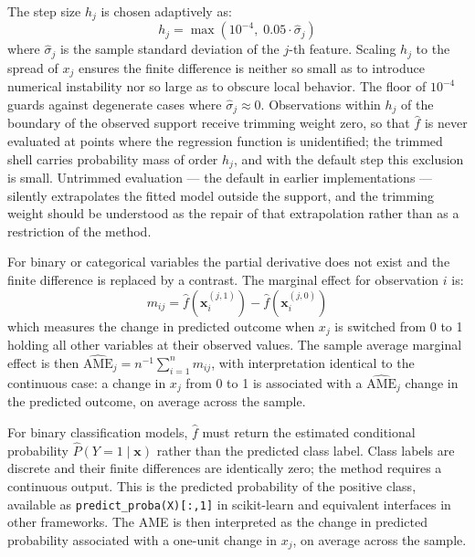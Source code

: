 \documentclass[12pt]{article}
\begin{document}
	The step size $h_j$ is chosen adaptively as:
	\begin{equation}
		h_j = \max\!\left(10^{-4},\; 0.05 \cdot \hat{\sigma}_j\right)
	\end{equation}
	where $\hat{\sigma}_j$ is the sample standard deviation of the $j$-th feature. Scaling $h_j$ to the spread of $x_j$ ensures the finite difference is neither so small as to introduce numerical instability nor so large as to obscure local behavior. The floor of $10^{-4}$ guards against degenerate cases where $\hat{\sigma}_j \approx 0$. Observations within $h_j$ of the boundary of the observed support receive trimming weight zero, so that $\hat{f}$ is never evaluated at points where the regression function is unidentified; the trimmed shell carries probability mass of order $h_j$, and with the default step this exclusion is small. Untrimmed evaluation --- the default in earlier implementations --- silently extrapolates the fitted model outside the support, and the trimming weight should be understood as the repair of that extrapolation rather than as a restriction of the method.
	
	For binary or categorical variables the partial derivative does not exist and the finite difference is replaced by a contrast. The marginal effect for observation $i$ is:
	\begin{equation}
		m_{ij} = \hat{f}\!\left(\mathbf{x}_i^{(j,1)}\right) - \hat{f}\!\left(\mathbf{x}_i^{(j,0)}\right)
	\end{equation}
	which measures the change in predicted outcome when $x_j$ is switched from 0 to 1 holding all other variables at their observed values. The sample average marginal effect is then $\widehat{\mathrm{AME}}_j = n^{-1}\sum_{i=1}^n m_{ij}$, with interpretation identical to the continuous case: a change in $x_j$ from 0 to 1 is associated with a $\widehat{\mathrm{AME}}_j$ change in the predicted outcome, on average across the sample.
	
	For binary classification models, $\hat{f}$ must return the estimated conditional probability $\hat{P}(Y=1 \mid \mathbf{x})$ rather than the predicted class label. Class labels are discrete and their finite differences are identically zero; the method requires a continuous output. This is the predicted probability of the positive class, available as \texttt{predict\_proba(X)[:,1]} in scikit-learn and equivalent interfaces in other frameworks. The AME is then interpreted as the change in predicted probability associated with a one-unit change in $x_j$, on average across the sample.
	
\end{document}
